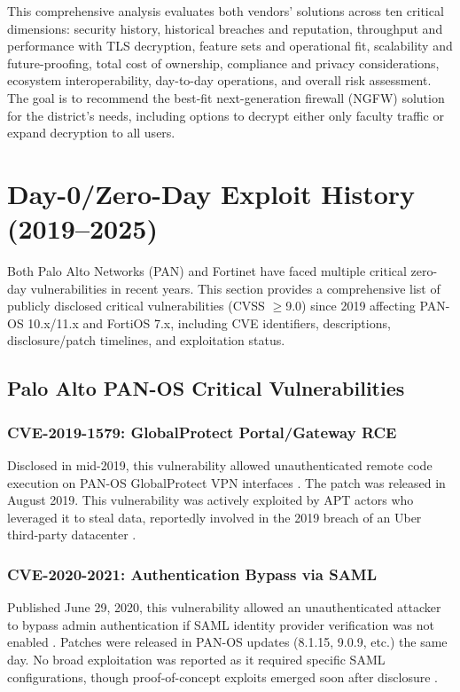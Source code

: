 \documentclass[12pt]{article}
\begin{document}
This comprehensive analysis evaluates both vendors' solutions across ten critical dimensions: security history, historical breaches and reputation, throughput and performance with TLS decryption, feature sets and operational fit, scalability and future-proofing, total cost of ownership, compliance and privacy considerations, ecosystem interoperability, day-to-day operations, and overall risk assessment. The goal is to recommend the best-fit next-generation firewall (NGFW) solution for the district's needs, including options to decrypt either only faculty traffic or expand decryption to all users.

\section{Day-0/Zero-Day Exploit History (2019–2025)}

Both Palo Alto Networks (PAN) and Fortinet have faced multiple critical zero-day vulnerabilities in recent years. This section provides a comprehensive list of publicly disclosed critical vulnerabilities (CVSS $\geq$9.0) since 2019 affecting PAN-OS 10.x/11.x and FortiOS 7.x, including CVE identifiers, descriptions, disclosure/patch timelines, and exploitation status.

\subsection{Palo Alto PAN-OS Critical Vulnerabilities}

\subsubsection{CVE-2019-1579: GlobalProtect Portal/Gateway RCE}
Disclosed in mid-2019, this vulnerability allowed unauthenticated remote code execution on PAN-OS GlobalProtect VPN interfaces \cite{cve20191579}. The patch was released in August 2019. This vulnerability was actively exploited by APT actors who leveraged it to steal data, reportedly involved in the 2019 breach of an Uber third-party datacenter \cite{threatpost2019} \cite{securityaffairs2019}.

\subsubsection{CVE-2020-2021: Authentication Bypass via SAML}
Published June 29, 2020, this vulnerability allowed an unauthenticated attacker to bypass admin authentication if SAML identity provider verification was not enabled \cite{fortra2020}. Patches were released in PAN-OS updates (8.1.15, 9.0.9, etc.) the same day. No broad exploitation was reported as it required specific SAML configurations, though proof-of-concept exploits emerged soon after disclosure \cite{portswigger2020}.
\end{document}
